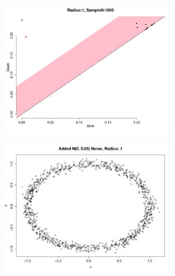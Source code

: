\documentclass[a4paper]{article}
\begin{document}
\begin{figure}[htp!]
\centering
\begin{subfigure}{.20\textwidth}
  \centering
  \includegraphics[width=\linewidth]{testtest1}
\end{subfigure}%
\begin{subfigure}{.20\textwidth}
  \centering
  \includegraphics[width=\linewidth]{testtest2}
\end{subfigure}%
\begin{subfigure}{.20\textwidth}
  \centering

\end{subfigure}
\end{figure}
\end{document}
